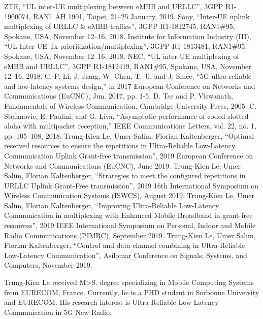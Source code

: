 \documentclass{ieeeaccess}
\begin{document}
\begin{thebibliography}{00}
 ZTE, ``UL inter-UE multiplexing between eMBB and URLLC'', 3GPP R1-1900074, RAN1 AH 1901, Taipei,  21--25 January, 2019.
  Sony, ``Inter-UE uplink multiplexing of URLLC \& eMBB traffics'', 3GPP R1-1812745, RAN1\#95, Spokane, USA, November 12--16, 2018.
  Institute for Information Industry (III), ``UL Inter UE Tx prioritization/multiplexing'', 3GPP R1-1813481, RAN1\#95, Spokane, USA, November 12--16, 2018.
  NEC, ``UL inter-UE multiplexing of eMBB and URLLC'', 3GPP R1-1812419, RAN1\#95, Spokane, USA, November 12--16, 2018.
  C.-P. Li, J. Jiang, W. Chen, T. Ji, and J. Smee, ``5G ultra-reliable and low-latency systems design,'' in 2017 European Conference on Networks and Communications (EuCNC), Jun. 2017, pp. 1-5. 
 D. Tse and P. Viswanath, Fundamentals of Wireless Communication. Cambridge University Press, 2005. 
 C. Stefanovic, E. Paolini, and G. Liva, ``Asymptotic performance of coded slotted aloha with multipacket reception,'' IEEE Communications Letters, vol. 22, no. 1, pp. 105--108, 2018.
 Trung-Kien Le, Umer Salim, Florian Kaltenberger, ``Optimal reserved resources to ensure the repetitions in Ultra-Reliable Low-Latency Communication Uplink Grant-free transmission'',  2019 European Conference on Networks and Communications (EuCNC), June 2019.
 Trung-Kien Le, Umer Salim, Florian Kaltenberger, ``Strategies to meet the configured repetitions in URLLC Uplink Grant-Free transmission'',  2019 16th International Symposium on Wireless Communication Systems (ISWCS), August 2019.
 Trung-Kien Le, Umer Salim, Florian Kaltenberger, ``Improving Ultra-Reliable Low-Latency Communication in multiplexing with Enhanced Mobile Broadband in grant-free resources'', 2019 IEEE International Symposium on Personal, Indoor and Mobile Radio Communications (PIMRC), September 2019.
 Trung-Kien Le, Umer Salim, Florian Kaltenberger, ``Control and data channel combining in Ultra-Reliable Low-Latency Communication'', Asilomar Conference on Signals, Systems, and Computers, November 2019.
\end{thebibliography}


\begin{IEEEbiography}{Trung-Kien Le} received M>S. degree specializing in Mobile Computing Systems from EURECOM, France. Currently, he is a PHD student in Sorbonne University and  EURECOM. His research interest is Ultra Reliable Low Latency Communication in 5G New Radio.
\end{IEEEbiography}
\end{document}
